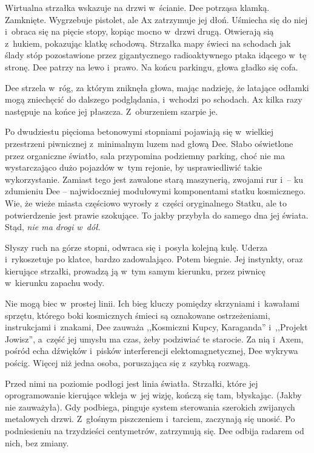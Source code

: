 \documentclass[oneside,polish,11pt,sfheadings]{mwbk}
\begin{document}
Wirtualna strzałka wskazuje na drzwi w~ścianie. Dee potrząsa klamką.
Zamknięte. Wygrzebuje pistolet, ale Ax zatrzymuje jej dłoń. Uśmiecha się
do niej i~obraca się na pięcie stopy, kopiąc mocno w~drzwi drugą.
Otwierają sią z~hukiem, pokazując klatkę schodową. Strzałka mapy świeci
na schodach jak ślady stóp pozostawione przez gigantycznego
radioaktywnego ptaka idącego w~tę stronę. Dee patrzy na lewo i~prawo. Na
końcu parkingu, głowa gładko się cofa.

Dee strzela w~róg, za którym zniknęła głowa, mając nadzieję, że latające
odłamki mogą zniechęcić do dalszego podglądania, i~wchodzi po schodach.
Ax kilka razy następuje na końce jej płaszcza. Z~oburzeniem szarpie je.

Po dwudziestu pięcioma betonowymi stopniami pojawiają się w~wielkiej
przestrzeni piwnicznej z~minimalnym luzem nad głową Dee. Słabo
oświetlone przez organiczne światło, sala przypomina podziemny parking,
choć nie ma wystarczająco dużo pojazdów w~tym rejonie, by usprawiedliwić
takie wykorzystanie. Zamiast tego jest zawalone starą maszynerią,
zwojami rur i~-- ku zdumieniu Dee -- najwidoczniej modułowymi komponentami
statku kosmicznego. Wie, że wieże miasta częściowo wyrosły z~części
oryginalnego Statku, ale to potwierdzenie jest prawie szokujące. To
jakby przybyła do samego dna jej świata. Stąd, \emph{nie ma drogi w~dół}.

Słyszy ruch na górze stopni, odwraca się i~posyła kolejną kulę. Uderza i~rykoszetuje po klatce, bardzo zadowalająco. Potem biegnie. Jej
instynkty, oraz kierujące strzałki, prowadzą ją w~tym samym kierunku,
przez piwnicę w~kierunku zapachu wody.

Nie mogą biec w~prostej linii. Ich bieg kluczy pomiędzy skrzyniami i~kawałami sprzętu, którego boki kosmicznych śmieci są oznakowane
ostrzeżeniami, instrukcjami i~znakami, Dee zauważa ,,Kosmiczni Kupcy,
Karaganda'' i~,,Projekt Jowisz'', a~część jej umysłu ma czas, żeby
podziwiać te starocie. Za nią i~Axem, pośród echa dźwięków i~pisków
interferencji elektomagnetycznej, Dee wykrywa pościg. Więcej niż jedna
osoba, poruszająca się z~szybką rozwagą.

Przed nimi na poziomie podłogi jest linia światła. Strzałki, które jej
oprogramowanie kierujące wkleja w~jej wizję, kończą się tam, błyskając.
(Jakby nie zauważyła). Gdy podbiega, pinguje system sterowania szerokich
zwijanych metalowych drzwi. Z~głośnym piszczeniem i~tarciem, zaczynają
się unosić. Po podniesieniu na trzydzieści centymetrów, zatrzymują się.
Dee odbija radarem od nich, bez zmiany.
\end{document}
